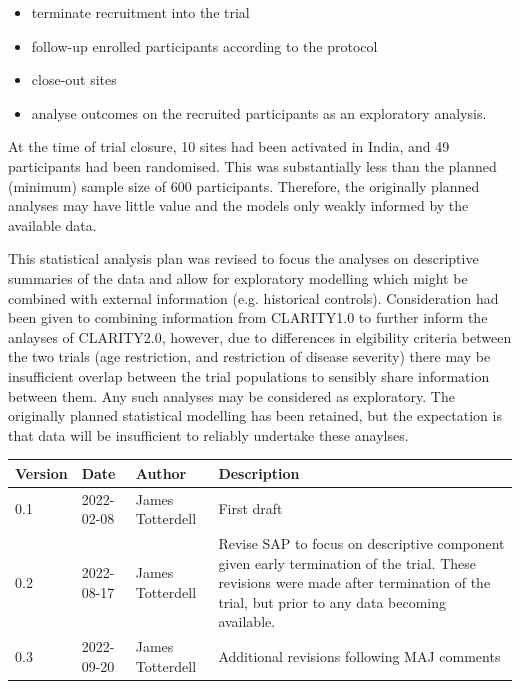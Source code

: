 \documentclass[11pt,parskip=half-]{scrartcl}
\begin{document}
\begin{itemize}
    \item terminate recruitment into the trial
    \item follow-up enrolled participants according to the protocol
    \item close-out sites
    \item analyse outcomes on the recruited participants as an exploratory analysis.
\end{itemize}

At the time of trial closure, 10 sites had been activated in India, and 49 participants had been randomised. This was substantially less than the planned (minimum) sample size of 600 participants. Therefore, the originally planned analyses may have little value and the models only weakly informed by the available data.

This statistical analysis plan was revised to focus the analyses on descriptive summaries of the data and allow for exploratory modelling which might be combined with external information (e.g. historical controls). Consideration had been given to combining information from CLARITY1.0 to further inform the anlayses of CLARITY2.0, however, due to differences in elgibility criteria between the two trials (age restriction, and restriction of disease severity) there may be insufficient overlap between the trial populations to sensibly share information between them. Any such analyses may be considered as exploratory. The originally planned statistical modelling has been retained, but the expectation is that data will be insufficient to reliably undertake these anaylses. 

\begin{table}[H]
    \begin{center}
        \begin{tabular}{lllp{6cm}}
            \hline
            Version & Date       & Author           & Description \\
            \hline
            0.1     & 2022-02-08 & James Totterdell & First draft \\
            0.2     & 2022-08-17 & James Totterdell & Revise SAP to focus on descriptive component given early termination of the trial. These revisions were made after termination of the trial, but prior to any data becoming available. \\
            0.3     & 2022-09-20 & James Totterdell & Additional revisions following MAJ comments \\
            \hline
        \end{tabular}
    \end{center}
\end{table}
\end{document}
